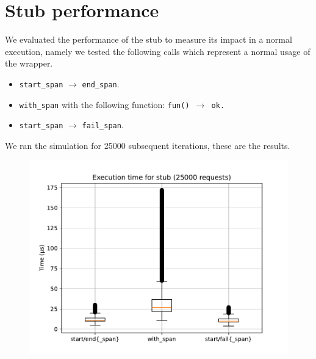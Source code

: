 \section{Stub performance}
    We evaluated the performance of the stub to measure its impact in a normal execution, namely we tested the following calls which represent a normal usage of the wrapper.
    \begin{itemize}
        \item \texttt{start\_span} $\rightarrow$ \texttt{end\_span}.
        \item \texttt{with\_span} with the following function: \texttt{fun() $\rightarrow$ ok.}
        \item \texttt{start\_span} $\rightarrow$ \texttt{fail\_span}.
    \end{itemize}

    We ran the simulation for 25000 subsequent iterations, these are the results.

    \begin{figure}[H]
        \begin{center}
            \includegraphics[width=\linewidth]{img/stub.pdf}
        \end{center}
    \end{figure}

